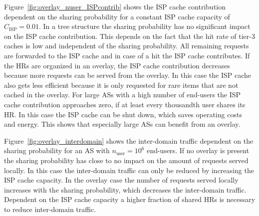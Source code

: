 

Figure~\ref{fig:overlay_nuser_ISPcontrib} shows the ISP cache contribution dependent on the sharing probability for a constant ISP cache capacity of $C_\text{ISP}=0.01$. In a tree structure the sharing probability has no significant impact on the ISP cache contribution. This depends on the fact that the hit rate of tier-3 caches is low and independent of the sharing probability. All remaining requests are forwarded to the ISP cache and in case of a hit the ISP cache contributes. If the HRs are organized in an overlay, the ISP cache contribution decreases because more requests can be served from the overlay. In this case the ISP cache also gets less efficient because it is only requested for rare items that are not cached in the overlay.
For large ASs with a high number of end-users the ISP cache contribution approaches zero, if at least every thousandth user shares its HR. In this case the ISP cache can be shut down, which saves operating costs and energy. This shows that especially large ASs can benefit from an overlay.


Figure~\ref{fig:overlay_interdomain} shows the inter-domain traffic dependent on the sharing probability for an AS with $n_\text{user}=10^6$ end-users. If no overlay is present the sharing probability has close to no impact on the amount of requests served locally. In this case the inter-domain traffic can only be reduced by increasing the ISP cache capacity. In the overlay case the number of requests served locally increases with the sharing probability, which decreases the inter-domain traffic. Dependent on the ISP cache capacity a higher fraction of shared HRs is necessary to reduce inter-domain traffic.

